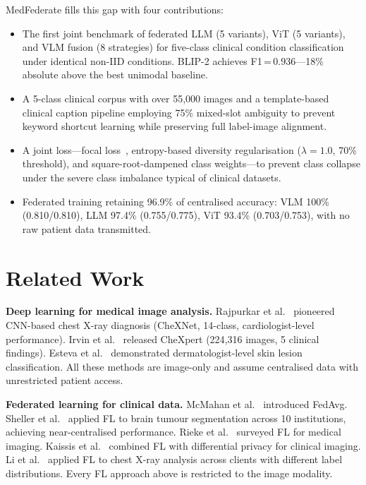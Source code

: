 \documentclass[conference]{IEEEtran}
\begin{document}
MedFederate fills this gap with four contributions:
\begin{itemize}
  \item The first joint benchmark of federated LLM (5 variants), ViT
        (5 variants), and VLM fusion (8 strategies) for five-class clinical
        condition classification under identical non-IID conditions. BLIP-2
        achieves F1\,=\,0.936---18\% absolute above the best unimodal
        baseline.
  \item A 5-class clinical corpus with over 55{,}000 images and a
        template-based clinical caption pipeline employing 75\% mixed-slot
        ambiguity to prevent keyword shortcut learning while preserving
        full label-image alignment.
  \item A joint loss---focal loss~\cite{Lin2017}, entropy-based diversity
        regularisation ($\lambda{=}1.0$, 70\% threshold), and
        square-root-dampened class weights---to prevent class collapse
        under the severe class imbalance typical of clinical datasets.
  \item Federated training retaining 96.9\% of centralised accuracy:
        VLM 100\% (0.810/0.810), LLM 97.4\% (0.755/0.775), ViT 93.4\%
        (0.703/0.753), with no raw patient data transmitted.
\end{itemize}

\section{Related Work}

\textbf{Deep learning for medical image analysis.}
Rajpurkar et al.~\cite{Rajpurkar2017} pioneered CNN-based chest X-ray
diagnosis (CheXNet, 14-class, cardiologist-level performance).
Irvin et al.~\cite{Irvin2019} released CheXpert (224{,}316 images,
5 clinical findings). Esteva et al.~\cite{Esteva2017} demonstrated
dermatologist-level skin lesion classification. All these methods are
image-only and assume centralised data with unrestricted patient access.

\textbf{Federated learning for clinical data.}
McMahan et al.~\cite{McMahan2017} introduced FedAvg. Sheller et
al.~\cite{Sheller2020} applied FL to brain tumour segmentation across
10 institutions, achieving near-centralised performance. Rieke et
al.~\cite{Rieke2020} surveyed FL for medical imaging. Kaissis et
al.~\cite{Kaissis2021} combined FL with differential privacy for
clinical imaging. Li et al.~\cite{LiHealth2020} applied FL to chest
X-ray analysis across clients with different label distributions.
Every FL approach above is restricted to the image modality.
\end{document}
